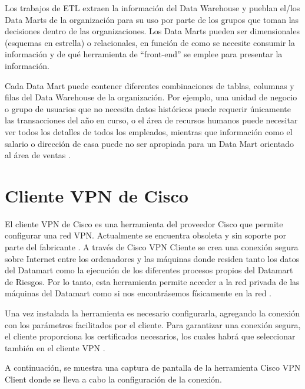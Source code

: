 \documentclass[a4paper, 12pt]{book}
\begin{document}
Los trabajos de ETL extraen la información del Data Warehouse y pueblan el/los Data Marts de la organización para su uso por parte de los grupos que toman las decisiones dentro de las organizaciones. Los Data Marts pueden ser dimensionales (esquemas en estrella) o relacionales, en función de como se necesite consumir la información y de qué herramienta de “front-end” se emplee para presentar la información.

Cada Data Mart puede contener diferentes combinaciones de tablas, columnas y filas del Data Warehouse de la organización. Por ejemplo, una unidad de negocio o grupo de usuarios que no necesita datos históricos puede requerir únicamente las transacciones del año en curso, o el área de recursos humanos puede necesitar ver todos los detalles de todos los empleados, mientras que información como el salario o dirección de casa puede no ser apropiada para un Data Mart orientado al área de ventas \cite{dwh1,dwh2,dwh3,dwh4,dwh5,dwh6,dwh7,dwh8}.

\section{Cliente VPN de Cisco}
\label{sec:Cisco_VPN}

El cliente VPN de Cisco es una herramienta del proveedor Cisco que permite configurar una red VPN. Actualmente se encuentra obsoleta y sin soporte por parte del fabricante \cite{cisco01:_cisco_vpn_client01}. A través de Cisco VPN Cliente se crea una conexión segura sobre Internet entre los ordenadores y las máquinas donde residen tanto los datos del Datamart como la ejecución de los diferentes procesos propios del Datamart de Riesgos. Por lo tanto, esta herramienta permite acceder a la red privada de las máquinas del Datamart como si nos encontrásemos físicamente en la red \cite{cisco02:_cisco_vpn_client02}.

Una vez instalada la herramienta es necesario configurarla, agregando la conexión con los parámetros facilitados por el cliente. Para garantizar una conexión segura, el cliente proporciona los certificados necesarios, los cuales habrá que seleccionar también en el cliente VPN \cite{deal2005complete}.

A continuación, se muestra una captura de pantalla de la herramienta Cisco VPN Client donde se lleva a cabo la configuración de la conexión.
\end{document}
